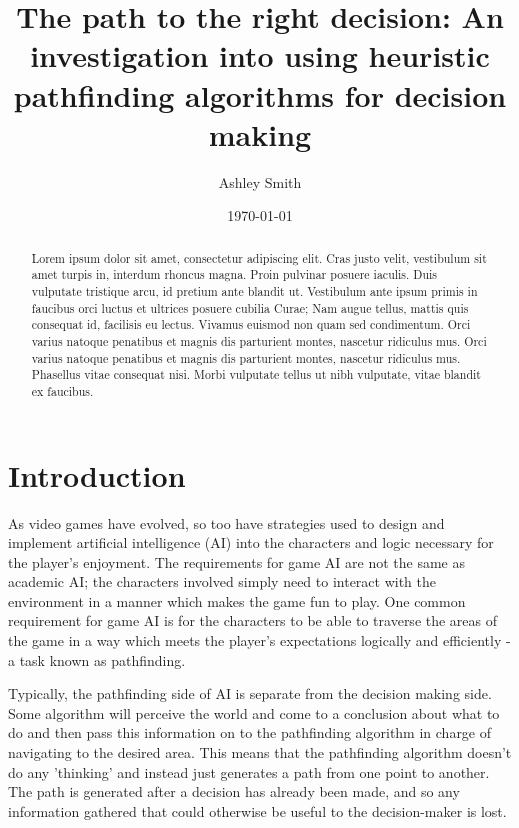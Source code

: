 \documentclass[10pt, twocolumn]{article}
\begin{document}
\title{\titlefont The path to the right decision: An investigation into using heuristic pathfinding algorithms for decision making}
\author{Ashley Smith}
\date{\today}
\maketitle

\renewcommand\abstractname{\textbf{Abstract}}
\begin{abstract}
Lorem ipsum dolor sit amet, consectetur adipiscing elit. Cras justo velit, vestibulum sit amet turpis in, interdum rhoncus magna. Proin pulvinar posuere iaculis. Duis vulputate tristique arcu, id pretium ante blandit ut. Vestibulum ante ipsum primis in faucibus orci luctus et ultrices posuere cubilia Curae; Nam augue tellus, mattis quis consequat id, facilisis eu lectus. Vivamus euismod non quam sed condimentum. Orci varius natoque penatibus et magnis dis parturient montes, nascetur ridiculus mus. Orci varius natoque penatibus et magnis dis parturient montes, nascetur ridiculus mus. Phasellus vitae consequat nisi. Morbi vulputate tellus ut nibh vulputate, vitae blandit ex faucibus.
\end{abstract}

\section{Introduction}

As video games have evolved, so too have strategies used to design and implement artificial intelligence (AI) into the characters and logic necessary for the player's enjoyment. The requirements for game AI are not the same as academic AI; the characters involved simply need to interact with the environment in a manner which makes the game fun to play. One common requirement for game AI is for the characters to be able to traverse the areas of the game in a way which meets the player's expectations logically and efficiently - a task known as pathfinding.

Typically, the pathfinding side of AI is separate from the decision making side. Some algorithm will perceive the world and come to a conclusion about what to do and then pass this information on to the pathfinding algorithm in charge of navigating to the desired area. This means that the pathfinding algorithm doesn't do any 'thinking' and instead just generates a path from one point to another. The path is generated after a decision has already been made, and so any information gathered that could otherwise be useful to the decision-maker is lost.
\end{document}
